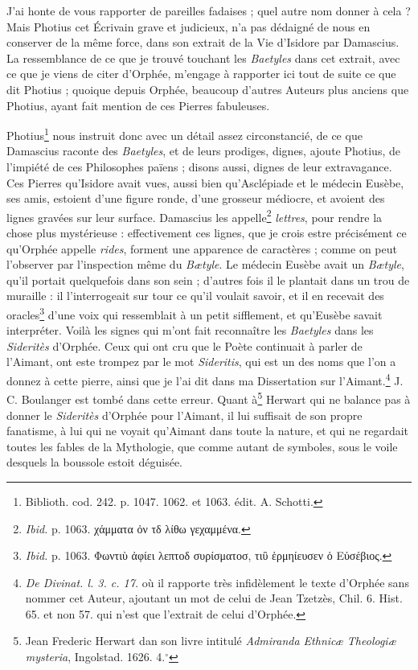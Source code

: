 \documentclass[a4paper, 11pt, oneside, polutonikogreek, french]{article}
\begin{document}
J'ai honte de vous rapporter de pareilles fadaises ; quel autre nom donner à cela ? Mais Photius cet Écrivain grave et judicieux, n'a pas dédaigné de nous en conserver de la même force, dans son extrait de la Vie d'Isidore par Damascius. La ressemblance de ce que je trouvé touchant les \emph{Baetyles} dans cet extrait, avec ce que je viens de citer d'Orphée, m'engage à rapporter ici tout de suite ce que dit Photius ; quoique depuis Orphée, beaucoup d'autres Auteurs plus anciens que Photius, ayant fait mention de ces Pierres fabuleuses.

Photius\footnote{Biblioth. cod. 242. p. 1047. 1062. et 1063. édit. A. Schotti.} nous instruit donc avec un détail assez circonstancié, de ce que Damascius raconte des \emph{Baetyles}, et de leurs prodiges, dignes, ajoute Photius, de l'impiété de ces Philosophes païens ; disons aussi, dignes de leur extravagance. Ces Pierres qu'Isidore avait vues, aussi bien qu'Asclépiade et le médecin Eusèbe, ses amis, estoient d'une figure ronde, d'une grosseur médiocre, et avoient des lignes gravées sur leur surface. Damascius les appelle\footnote{\emph{Ibid.} p. 1063. χάμματα ὀν τδ λίθω γεχαμμένα.} \emph{lettres}, pour rendre la chose plus mystérieuse : effectivement ces lignes, que je crois estre précisément ce qu'Orphée appelle \emph{rides}, forment une apparence de caractères ; comme on peut l'observer par l'inspection même du \emph{Bætyle}. Le médecin Eusèbe avait un \emph{Bætyle}, qu'il portait quelquefois dans son sein ; d'autres fois il le plantait dans un trou de muraille : il l'interrogeait sur tour ce qu'il voulait savoir, et il en recevait des oracles\footnote{\emph{Ibid.} p. 1063. Φωντιὺ ἀφίει λεπτοδ συρίσματοσ, τιὒ ἑρμηίευσεν ὁ Εὐσέβιος.} d'une voix qui ressemblait à un petit sifflement, et qu'Eusèbe savait interpréter. Voilà les signes qui m'ont fait reconnaître les \emph{Baetyles} dans les \emph{Sideritès} d'Orphée. Ceux qui ont cru que le Poète continuait à parler de l'Aimant, ont este trompez par le mot \emph{Sideritis}, qui est un des noms que l'on a donnez à cette pierre, ainsi que je l'ai dit dans ma Dissertation sur l'Aimant.\footnote{\emph{De Divinat. l. 3. c. 17.} où il rapporte très infidèlement le texte d'Orphée sans nommer cet Auteur, ajoutant un mot de celui de Jean Tzetzès, Chil. 6. Hist. 65. et non 57. qui n'est que l'extrait de celui d'Orphée.} J. C. Boulanger est tombé dans cette erreur. Quant à\footnote{Jean Frederic Herwart dan son livre intitulé \emph{Admiranda Ethnicæ Theologiæ mysteria}, Ingolstad. 1626. 4.$^\circ$} Herwart qui ne balance pas à donner le \emph{Sideritès} d'Orphée pour l'Aimant, il lui suffisait de son propre fanatisme, à lui qui ne voyait qu'Aimant dans toute la nature, et qui ne regardait toutes les fables de la Mythologie, que comme autant de symboles, sous le voile desquels la boussole estoit déguisée.
\end{document}
